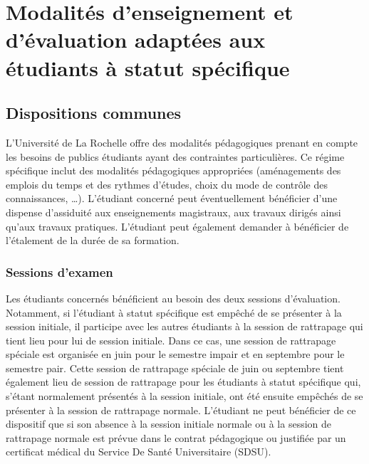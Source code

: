 \documentclass[a4paper,11pt]{article}
\begin{document}
\section{Modalités d'enseignement et d'évaluation adaptées aux étudiants à statut spécifique}\label{StatutSpe}
\subsection{Dispositions communes}\label{Communes}
L'Université de La Rochelle offre des modalités pédagogiques prenant en compte les besoins de publics étudiants ayant des contraintes particulières.
Ce régime spécifique inclut des modalités pédagogiques appropriées (aménagements des emplois du temps et des rythmes d'études, choix du mode de contrôle des connaissances, \ldots{}). L'étudiant concerné peut éventuellement bénéficier d'une dispense d'assiduité aux enseignements magistraux, aux travaux dirigés ainsi qu'aux travaux pratiques. L'étudiant peut également demander à bénéficier de l'étalement de la durée de sa formation.

\subsubsection{Sessions d'examen}\label{DispoExam}
Les étudiants concernés bénéficient au besoin des deux sessions d'évaluation. Notamment, si l'étudiant à statut spécifique est empêché de se présenter à la session initiale, il participe avec les autres étudiants à la session de rattrapage qui tient lieu pour lui de session initiale. Dans ce cas, une session de rattrapage spéciale est organisée en juin pour le semestre impair et en septembre pour le semestre pair.
Cette session de rattrapage spéciale de juin ou septembre tient également lieu de session de rattrapage pour les étudiants à statut spécifique qui, s'étant normalement présentés à la session initiale, ont été ensuite empêchés de se présenter à la session de rattrapage normale.
L'étudiant ne peut bénéficier de ce dispositif que si son absence à la session initiale normale ou à la session de rattrapage normale est prévue dans le contrat pédagogique ou justifiée par un certificat médical du Service De Santé Universitaire (SDSU).
\end{document}
